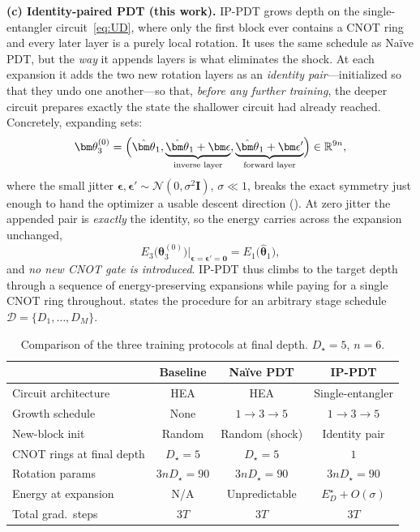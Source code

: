 \documentclass[11pt]{article}
\newcommand{\bbR}{\mathbb{R}}
\theoremstyle{plain}
\theoremstyle{plain}
\begin{document}
\medskip\noindent\textbf{(c) Identity-paired PDT (this work).}
IP-PDT grows depth on the single-entangler circuit~\eqref{eq:UD}, where
only the first block ever contains a CNOT ring and every later layer is
a purely local rotation.  It uses the same schedule as
Na\"ive PDT, but the \emph{way} it appends layers is what eliminates the
shock.  At each expansion it adds the two new rotation layers as an
\emph{identity pair}---initialized so that they undo one another---so
that, \emph{before any further training}, the deeper circuit prepares
exactly the state the shallower circuit had already reached.  Concretely,
expanding sets:
\begin{equation}\label{eq:ippdt_expand1}
  \bm\theta_3^{(0)}
  =\Bigl(\hat{\bm\theta}_1,
    \underbrace{\hat{\bm\theta}_1+\bm\epsilon}_{\text{inverse layer}},
    \underbrace{\hat{\bm\theta}_1+\bm\epsilon'}_{\text{forward layer}}\Bigr)\in\bbR^{9n},
\end{equation}
where the small jitter
$\bm\epsilon,\bm\epsilon'\sim\mathcal{N}(0,\sigma^2 \mathbf{I})$, $\sigma\ll 1$,
breaks the exact symmetry just enough to hand the optimizer a usable
descent direction ().  At zero jitter the appended pair
is \emph{exactly} the identity, so the energy carries across the
expansion unchanged,
\begin{equation}\label{eq:energy_preserve}
  E_3\bigl(\bm\theta_3^{(0)}\bigr)\big|_{\bm\epsilon=\bm\epsilon'=\bm 0}
  =E_1\bigl(\hat{\bm\theta}_1\bigr),
\end{equation}
and \emph{no new CNOT gate is introduced}.  IP-PDT thus climbs to
the target depth through a sequence of energy-preserving expansions
while paying for a single CNOT ring throughout.   states
the procedure for an arbitrary stage schedule
$\mathcal{D}=\{D_1,\dots,D_M\}$.
\begin{table}[t]
\centering\small
\caption{Comparison of the three training protocols at final depth.
$D_\star=5$, $n=6$.}
\label{tab:protocol_summary}
\begin{tabular}{lccc}
\toprule
 & \textbf{Baseline} & \textbf{Na\"ive PDT} & \textbf{IP-PDT} \\
\midrule
Circuit architecture & HEA & HEA & Single-entangler \\
Growth schedule   & None & $1\to 3\to 5$ & $1\to 3\to 5$ \\
New-block init    & Random & Random (shock) & Identity pair \\
CNOT rings at final depth & $D_\star=5$ & $D_\star=5$ & $1$ \\
Rotation params   & $3nD_\star=90$ & $3nD_\star=90$ & $3nD_\star=90$ \\
Energy at expansion & N/A & Unpredictable & $E_D^\star+O(\sigma)$ \\
Total grad.\ steps & $3T$ & $3T$ & $3T$ \\
\bottomrule
\end{tabular}
\end{table}
\end{document}
